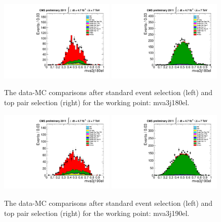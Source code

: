 \begin{figure}[!t]
  \centering
  \includegraphics[width=0.49\textwidth]{figs/cl-mva3j180el-normal.pdf}
  \includegraphics[width=0.49\textwidth]{figs/cl-mva3j180el-inTTbar.pdf}
  \caption{\label{fig:mva:plots-mva3j180el} The data-MC comparisons
    after standard event selection (left) and top pair
    selection (right) for the working point: mva3j180el.}
\end{figure}

\begin{figure}[!t]
  \centering
  \includegraphics[width=0.49\textwidth]{figs/cl-mva3j190el-normal.pdf}
  \includegraphics[width=0.49\textwidth]{figs/cl-mva3j190el-inTTbar.pdf}
  \caption{\label{fig:mva:plots-mva3j190el} The data-MC comparisons
    after standard event selection (left) and top pair
    selection (right) for the working point: mva3j190el.}
\end{figure}

